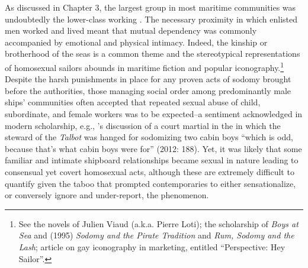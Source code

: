 As discussed in Chapter 3, the largest group in most maritime communities was undoubtedly the lower-class working . The necessary proximity in which enlisted men worked and lived meant that mutual dependency was commonly accompanied by emotional and physical intimacy. Indeed, the kinship or brotherhood of the seas is a common theme and the stereotypical representations of homosexual sailors abounds in maritime fiction and popular iconography.\footnote{See the novels of Julien Viaud (a.k.a. Pierre Loti); the scholarship of  \textit{Boys at Sea} and (1995) \textit{Sodomy and the Pirate Tradition} and  \textit{Rum, Sodomy and the Lash};  article on gay iconography in marketing, entitled “Perspective: Hey Sailor”.} Despite the harsh punishments in place for any proven acts of sodomy brought before the authorities, those managing social order among predominantly male ships’ communities often accepted that repeated sexual abuse of child, subordinate, and female workers was to be expected–a sentiment acknowledged in modern scholarship, e.g., \citeauthor{Bicheno2012}’s discussion of a court martial in the  in which the steward of the \textit{Talbot} was hanged for sodomizing two cabin boys “which is odd, because that’s what cabin boys were for” (2012: 188). Yet, it was likely that some familiar and intimate shipboard relationships became sexual in nature leading to consensual yet covert homosexual acts, although these are extremely difficult to quantify given the taboo that prompted contemporaries to either sensationalize, or conversely ignore and under-report, the phenomenon. 

